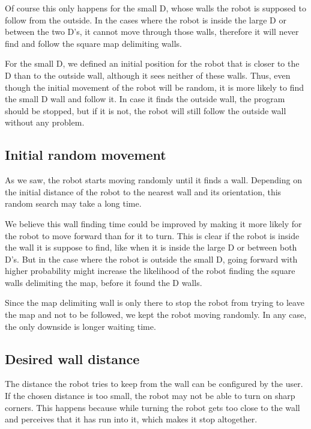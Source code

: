 \documentclass[10pt,journal,compsoc]{IEEEtran}
\begin{document}
Of course this only happens for the small D, whose walls the robot is supposed to follow from the outside. In the cases where the robot is inside the large D or between the two D's, it cannot move through those walls, therefore it will never find and follow the square map delimiting walls.

For the small D, we defined an initial position for the robot that is closer to the D than to the outside wall, although it sees neither of these walls. Thus, even though the initial movement of the robot will be random, it is more likely to find the small D wall and follow it. In case it finds the outside wall, the program should be stopped, but if it is not, the robot will still follow the outside wall without any problem.

\subsection{Initial random movement}

As we saw, the robot starts moving randomly until it finds a wall. Depending on the initial distance of the robot to the nearest wall and its orientation, this random search may take a long time. 

We believe this wall finding time could be improved by making it more likely for the robot to move forward than for it to turn. This is clear if the robot is inside the wall it is suppose to find, like when it is inside the large D or between both D's. But in the case where the robot is outside the small D, going forward with higher probability might increase the likelihood of the robot finding the square walls delimiting the map, before it found the D walls.

Since the map delimiting wall is only there to stop the robot from trying to leave the map and not to be followed, we kept the robot moving randomly. In any case, the only downside is longer waiting time.

\subsection{Desired wall distance}

The distance the robot tries to keep from the wall can be configured by the user. If the chosen distance is too small, the robot may not be able to turn on sharp corners. This happens because while turning the robot gets too close to the wall and perceives that it has run into it, which makes it stop altogether.
\end{document}
